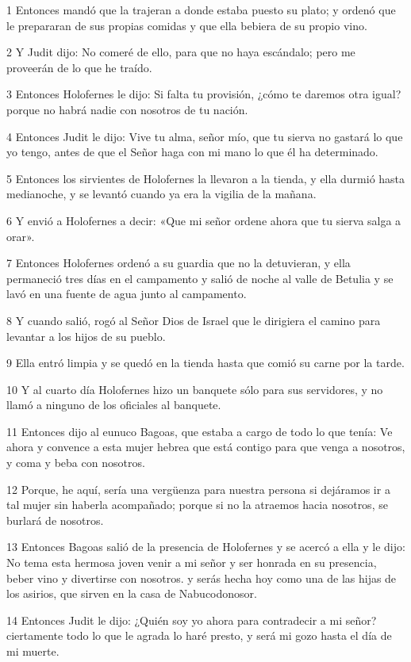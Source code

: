 \par 1 Entonces mandó que la trajeran a donde estaba puesto su plato; y ordenó que le prepararan de sus propias comidas y que ella bebiera de su propio vino.
\par 2 Y Judit dijo: No comeré de ello, para que no haya escándalo; pero me proveerán de lo que he traído.
\par 3 Entonces Holofernes le dijo: Si falta tu provisión, ¿cómo te daremos otra igual? porque no habrá nadie con nosotros de tu nación.
\par 4 Entonces Judit le dijo: Vive tu alma, señor mío, que tu sierva no gastará lo que yo tengo, antes de que el Señor haga con mi mano lo que él ha determinado.
\par 5 Entonces los sirvientes de Holofernes la llevaron a la tienda, y ella durmió hasta medianoche, y se levantó cuando ya era la vigilia de la mañana.
\par 6 Y envió a Holofernes a decir: «Que mi señor ordene ahora que tu sierva salga a orar».
\par 7 Entonces Holofernes ordenó a su guardia que no la detuvieran, y ella permaneció tres días en el campamento y salió de noche al valle de Betulia y se lavó en una fuente de agua junto al campamento.
\par 8 Y cuando salió, rogó al Señor Dios de Israel que le dirigiera el camino para levantar a los hijos de su pueblo.
\par 9 Ella entró limpia y se quedó en la tienda hasta que comió su carne por la tarde.
\par 10 Y al cuarto día Holofernes hizo un banquete sólo para sus servidores, y no llamó a ninguno de los oficiales al banquete.
\par 11 Entonces dijo al eunuco Bagoas, que estaba a cargo de todo lo que tenía: Ve ahora y convence a esta mujer hebrea que está contigo para que venga a nosotros, y coma y beba con nosotros.
\par 12 Porque, he aquí, sería una vergüenza para nuestra persona si dejáramos ir a tal mujer sin haberla acompañado; porque si no la atraemos hacia nosotros, se burlará de nosotros.
\par 13 Entonces Bagoas salió de la presencia de Holofernes y se acercó a ella y le dijo: No tema esta hermosa joven venir a mi señor y ser honrada en su presencia, beber vino y divertirse con nosotros. y serás hecha hoy como una de las hijas de los asirios, que sirven en la casa de Nabucodonosor.
\par 14 Entonces Judit le dijo: ¿Quién soy yo ahora para contradecir a mi señor? ciertamente todo lo que le agrada lo haré presto, y será mi gozo hasta el día de mi muerte.
